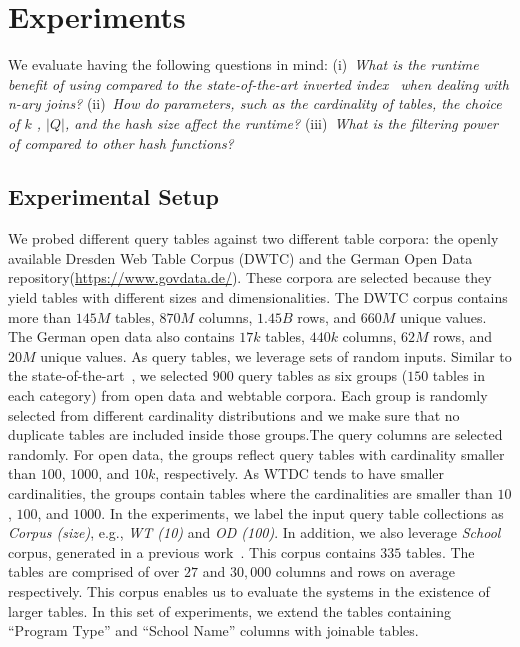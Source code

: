 \section{Experiments}\label{sec:experiments}
We evaluate \system having the following questions in mind:
(i)~{\em What is the runtime benefit of using \system compared to the state-of-the-art inverted index~\cite{abedjan2015dataxformer} when dealing with n-ary joins?}
(ii)~{\em How do parameters, such as the cardinality of tables, the choice of $k$ , $|Q|$, and the hash size affect the runtime?}
(iii)~{\em What is the filtering power of \hash compared to other hash functions?}
\subsection{Experimental Setup} \label{subsec:experimental_setup}
We probed different query tables against two different table corpora: the openly available Dresden Web Table Corpus (DWTC) and the German Open Data repository(\url{https://www.govdata.de/}). These corpora are selected because they yield tables with different sizes and dimensionalities.
The DWTC corpus contains more than $145M$ tables, $870M$ columns, $1.45B$ rows, and $660M$ unique values. 
The German open data also contains $17k$ tables, $440k$ columns, $62M$ rows, and $20M$ unique values. 
As query tables, we leverage sets of random inputs.
Similar to the state-of-the-art~\cite{zhu2019josie}, we selected $900$ query tables as six groups ($150$ tables in each category) from open data and webtable corpora. Each group is randomly selected from different cardinality distributions and we make sure that no duplicate tables are included inside those groups.The query columns are selected randomly.
For open data, the groups reflect query tables with cardinality smaller than $100$, $1000$, and $10k$, respectively. As WTDC tends to have smaller cardinalities, the groups contain tables where the cardinalities are smaller than $10$, $100$, and $1000$. In the experiments, we label the input query table collections as \textit{Corpus (size)}, e.g., \textit{WT (10)} and \textit{OD (100)}.
In addition, we also leverage \textit{School} corpus, generated in a previous work~\cite{chepurko13arda}. This corpus contains $335$ tables. The tables are comprised of over $27$ and $30,000$ columns and rows on average respectively. This corpus enables us to evaluate the systems in the existence of larger tables. In this set of experiments, we extend the tables containing ``Program Type'' and ``School Name'' columns with joinable tables.

